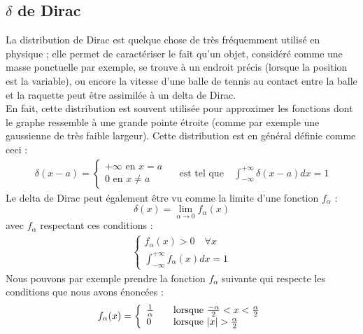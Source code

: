 \documentclass[../notesdecours.tex]{subfiles}
\begin{document}
\subsection{$\delta$ de Dirac}
La distribution de Dirac est quelque chose de très fréquemment utilisé en physique ; elle permet de caractériser le fait qu'un objet, considéré comme une masse ponctuelle par exemple, se trouve à un endroit précis (lorsque la position est la variable), 
ou encore la vitesse d'une balle de tennis au contact entre la balle et la raquette peut être assimilée à un delta de Dirac. \\
En fait, cette distribution est souvent utilisée pour approximer les fonctions dont le graphe ressemble à une grande pointe étroite (comme par exemple une gaussienne de très faible largeur). %
Cette distribution est en général définie comme ceci :  
\begin{align}
    \delta(x-a) = \left\lbrace \begin{array}{lll}
        +\infty \mbox{ en $x = a$} \\
        0 \mbox{ en $x \ne a$} 
    \end{array}\right. \quad \mbox{ est tel que} \quad \int_{-\infty}^{+\infty} \delta(x-a) dx = 1
\end{align}
Le delta de Dirac peut également être vu comme la limite d'une fonction $f_{\alpha}$ : \begin{equation} 
    \delta(x) = \lim_{\alpha \to 0} f_{\alpha} (x) \end{equation}
avec $f_{\alpha}$ respectant ces conditions : 
\begin{align*}
    \left\lbrace \begin{array}{lll}
        f_{\alpha} (x) >  0 \quad \forall x \\
        \int_{-\infty}^{+\infty} f_{\alpha} (x) dx = 1
    \end{array}\right. 
\end{align*}
Nous pouvons par exemple prendre la fonction $f_{\alpha}$ suivante qui respecte les conditions que nous avons énoncées : 
\begin{align*}
    f_{\alpha} (x) = \left\lbrace \begin{array}{lll}
        \frac{1}{\alpha} \quad &\mbox{lorsque } \frac{- \alpha}{2} <  x < \frac{\alpha}{2} \\
        0 \quad &\mbox{lorsque } \abs{x} >  \frac{\alpha}{2}    
    \end{array}\right. 
\end{align*}
\end{document}
